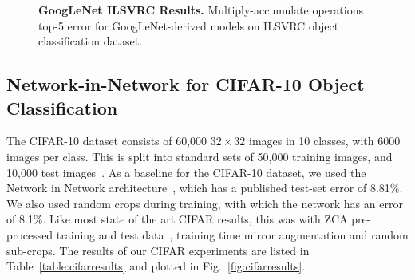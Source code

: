\documentclass[thesis]{subfiles}
\begin{document}
    \begin{figure}[tbp] 
        \centering
        \datatable
        
        
        \caption{\textbf{GoogLeNet ILSVRC Results.} Multiply-accumulate operations \vs top-5 error for GoogLeNet-derived models on ILSVRC object classification dataset.}
        \label{fig:googlenetimagenetresults}
    \end{figure}
    
    \subsection{Network-in-Network for CIFAR-10 Object Classification}
    The CIFAR-10 dataset consists of 60,000 $32\times 32$ images in 10 classes, with 6000 images per class. This is split into standard sets of 50,000 training images, and 10,000 test images~\citep{CIFAR10}. As a baseline for the CIFAR-10 dataset, we used the Network in Network architecture~\citep{Lin2014}, which has a published test-set error of 8.81\%. We also used random crops during training, with which the network has an error of 8.1\%. Like most state of the art CIFAR results, this was with ZCA pre-processed training and test data~\citep{goodfellow2013maxout}, training time mirror augmentation and random sub-crops. The results of our CIFAR experiments are listed in Table~\ref{table:cifarresults} and plotted in Fig.~\ref{fig:cifarresults}.
    
\end{document}
